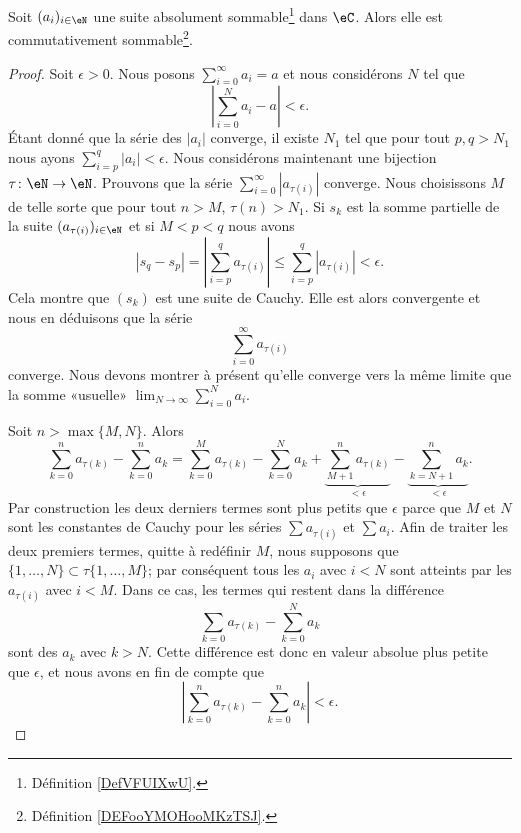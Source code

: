 \begin{proposition} 	\label{PROPooOGOEooBkZoEJ}
	Soit \( (a_i)_{i\in \eN}\) une suite absolument sommable\footnote{Définition \ref{DefVFUIXwU}.} dans \( \eC\). Alors elle est commutativement sommable\footnote{Définition \ref{DEFooYMOHooMKzTSJ}.}.
\end{proposition}

\begin{proof}
	Soit \( \epsilon>0\). Nous posons \( \sum_{i=0}^\infty a_i=a\) et nous considérons \( N\) tel que
	\begin{equation}
		| \sum_{i=0}^Na_i-a |<\epsilon.
	\end{equation}
	Étant donné que la série des \( | a_i |\) converge, il existe \( N_1\) tel que pour tout \( p,q>N_1\) nous ayons \( \sum_{i=p}^q| a_i |<\epsilon\). Nous considérons maintenant une bijection \( \tau\colon \eN\to \eN \). Prouvons que la série \( \sum_{i=0}^{\infty}| a_{\tau(i)} |\) converge. Nous choisissons \( M\) de telle sorte que pour tout \( n>M\), \( \tau(n)>N_1\). Si \( s_k\) est la somme partielle de la suite \( ( a_{\tau(i)} )_{i\in \eN}\) et si \( M<p<q \) nous avons
	\begin{equation}
		| s_q-s_p |= | \sum_{i=p}^q a_{\tau(i)} | \leq \sum_{i=p}^q| a_{\tau(i)} |<\epsilon.
	\end{equation}
	Cela montre que \( (s_k)\) est une suite de Cauchy. Elle est alors convergente et nous en déduisons que la série
	\begin{equation}
		\sum_{i=0}^{\infty}a_{\tau(i)}
	\end{equation}
	converge. Nous devons montrer à présent qu'elle converge vers la même limite que la somme «usuelle» \( \lim_{N\to \infty} \sum_{i=0}^Na_i\).

	Soit \( n>\max\{ M,N \}\). Alors
	\begin{equation}
		\sum_{k=0}^na_{\tau(k)}-\sum_{k=0}^na_k=\sum_{k=0}^Ma_{\tau(k)}-\sum_{k=0}^Na_k+\underbrace{\sum_{M+1}^na_{\tau(k)}}_{<\epsilon}-\underbrace{\sum_{k=N+1}^na_k}_{<\epsilon}.
	\end{equation}
	Par construction les deux derniers termes sont plus petits que \( \epsilon\) parce que \( M\) et \( N\) sont les constantes de Cauchy pour les séries \( \sum a_{\tau(i)}\) et \( \sum a_i\). Afin de traiter les deux premiers termes, quitte à redéfinir \( M\), nous supposons que \( \{ 1,\ldots, N \}\subset \tau\{ 1,\ldots, M \}\); par conséquent tous les \( a_i\) avec \( i<N\) sont atteints par les \( a_{\tau(i)}\) avec \( i<M\). Dans ce cas, les termes qui restent dans la différence
	\begin{equation}
		\sum_{k=0}a_{\tau(k)}-\sum_{k=0}^Na_k
	\end{equation}
	sont des \( a_k\) avec \( k>N\). Cette différence est donc en valeur absolue plus petite que \( \epsilon\), et nous avons en fin de compte que
	\begin{equation}
		\left| \sum_{k=0}^na_{\tau(k)}-\sum_{k=0}^na_k \right| <\epsilon.
	\end{equation}
\end{proof}

